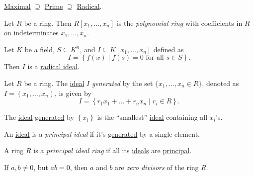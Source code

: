 \begin{remark}
	\hyperref[def:proper-ideal-maximal]{Maximal} \(\supseteq \) \hyperref[def:prime]{Prime} \(\supseteq \) \hyperref[def:radical]{Radical}.
\end{remark}

\begin{definition}\label{def:polynomial-ring}
	Let \(R\) be a ring. Then \(R[x_1, \ldots , x_n]\) is the \emph{polynomial ring} with coefficients in \(R\) on indeterminates \(x_1, \ldots , x_n\).
\end{definition}

\begin{eg}
	Let \(K\) be a field, \(S \subseteq K^n\), and \(I \subseteq K[x_1, \ldots , x_n]\) defined as
	\[
		I=\left\{ f(\overline{x} ) \mid f(\overline{s} )= 0\text{ for all }\overline{s} \in S \right\}.
	\]
	Then \(I\) is a \hyperref[def:radical]{radical ideal}.
\end{eg}


\begin{definition}\label{def:ideal-generation}
	Let \(R\) be a ring. The \hyperref[def:ideal]{ideal} \(I\) \emph{generated} by the set \(\{x_1, \ldots , x_n\in R\}\), denoted as \(I=(x_1, \ldots , x_n)\), is given by
	\[
		I = \left\{ r_1 x_1 + \ldots + r_n x_n \mid r_i \in R \right\}.
	\]
\end{definition}

\begin{intuition}
	The \hyperref[def:ideal]{ideal} \hyperref[def:ideal-generation]{generated} by \(\left\{ x_i \right\} \) is the ``smallest'' \hyperref[def:ideal]{ideal} containing all \(x_i\)'s.
\end{intuition}

\begin{definition}\label{def:principal-ideal}
	An \hyperref[def:ideal]{ideal} is a \emph{principal ideal} if it's \hyperref[def:ideal-generation]{generated} by a single element.
\end{definition}

\begin{definition}\label{def:principal-ideal-ring}
	A ring \(R\) is a \emph{principal ideal ring} if all its \hyperref[def:ideal]{ideals} are \hyperref[def:principal-ideal]{principal}.
\end{definition}

\begin{prev}\label{prev:zero-divisor}
	If \(a, b \neq 0\), but \(ab = 0\), then \(a\) and \(b\) are \emph{zero divisors} of the ring \(R\).
\end{prev}

